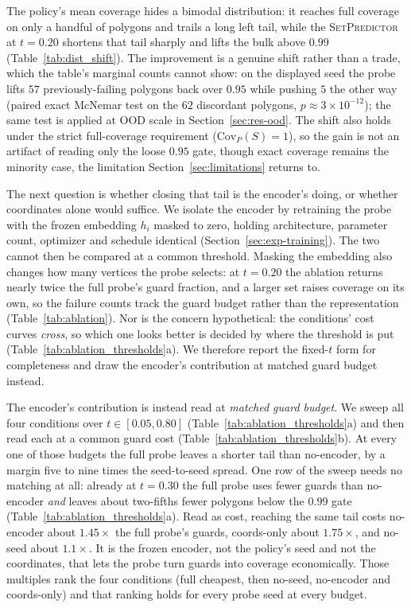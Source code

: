 \documentclass[11pt]{article}
\newcommand{\Covf}[1]{\mathrm{Cov}_P(#1)}
\newcommand{\SetPredictor}{\textup{\textsc{SetPredictor}}}
\newcommand{\cfeas}{0.95} %
\begin{document}
The policy's mean coverage hides a bimodal distribution: it reaches full coverage on only a handful of polygons and trails a long left tail, while the \SetPredictor{} at $t = 0.20$ shortens that tail sharply and lifts the bulk above $0.99$ (Table~\ref{tab:dist_shift}). The improvement is a genuine shift rather than a trade, which the table's marginal counts cannot show: on the displayed seed the probe lifts $57$ previously-failing polygons back over $\cfeas$ while pushing $5$ the other way (paired exact McNemar test on the $62$ discordant polygons, $p \approx 3 \times 10^{-12}$); the same test is applied at OOD scale in Section~\ref{sec:res-ood}. The shift also holds under the strict full-coverage requirement ($\Covf{S} = 1$), so the gain is not an artifact of reading only the loose $0.95$ gate, though exact coverage remains the minority case, the limitation Section~\ref{sec:limitations} returns to.

The next question is whether closing that tail is the encoder's doing, or whether coordinates alone would suffice. We isolate the encoder by retraining the probe with the frozen embedding $h_i$ masked to zero, holding architecture, parameter count, optimizer and schedule identical (Section~\ref{sec:exp-training}). The two cannot then be compared at a common threshold. Masking the embedding also changes how many vertices the probe selects: at $t = 0.20$ the ablation returns nearly twice the full probe's guard fraction, and a larger set raises coverage on its own, so the failure counts track the guard budget rather than the representation (Table~\ref{tab:ablation}). Nor is the concern hypothetical: the conditions' cost curves \emph{cross}, so which one looks better is decided by where the threshold is put (Table~\ref{tab:ablation_thresholds}a). We therefore report the fixed-$t$ form for completeness and draw the encoder's contribution at matched guard budget instead.

The encoder's contribution is instead read at \emph{matched guard budget}. We sweep all four conditions over $t \in [0.05, 0.80]$ (Table~\ref{tab:ablation_thresholds}a) and then read each at a common guard cost (Table~\ref{tab:ablation_thresholds}b). At every one of those budgets the full probe leaves a shorter tail than no-encoder, by a margin five to nine times the seed-to-seed spread. One row of the sweep needs no matching at all: already at $t = 0.30$ the full probe uses fewer guards than no-encoder \emph{and} leaves about two-fifths fewer polygons below the $0.99$ gate (Table~\ref{tab:ablation_thresholds}a). Read as cost, reaching the same tail costs no-encoder about $1.45\times$ the full probe's guards, coords-only about $1.75\times$, and no-seed about $1.1\times$. It is the frozen encoder, not the policy's seed and not the coordinates, that lets the probe turn guards into coverage economically. Those multiples rank the four conditions (full cheapest, then no-seed, no-encoder and coords-only) and that ranking holds for every probe seed at every budget.
\end{document}
